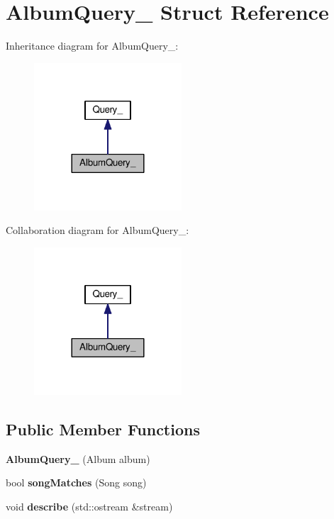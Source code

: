 \hypertarget{struct_album_query__}{}\section{Album\+Query\+\_\+ Struct Reference}
\label{struct_album_query__}


Inheritance diagram for Album\+Query\+\_\+\+:
\nopagebreak
\begin{figure}[H]
\begin{center}
\leavevmode
\includegraphics[width=156pt]{struct_album_query____inherit__graph}
\end{center}
\end{figure}


Collaboration diagram for Album\+Query\+\_\+\+:
\nopagebreak
\begin{figure}[H]
\begin{center}
\leavevmode
\includegraphics[width=156pt]{struct_album_query____coll__graph}
\end{center}
\end{figure}
\subsection*{Public Member Functions}
\begin{DoxyCompactItemize}
\item 
{\bfseries Album\+Query\+\_\+} (Album album)\hypertarget{struct_album_query___abd744cb06957c0daacc89fb41dd13874}{}\label{struct_album_query___abd744cb06957c0daacc89fb41dd13874}

\item 
bool {\bfseries song\+Matches} (Song song)\hypertarget{struct_album_query___a006936a1e4964df9b1c71227261282d3}{}\label{struct_album_query___a006936a1e4964df9b1c71227261282d3}

\item 
void {\bfseries describe} (std\+::ostream \&stream)\hypertarget{struct_album_query___af3c11ff7248ae1a6c135ace088cb4a24}{}\label{struct_album_query___af3c11ff7248ae1a6c135ace088cb4a24}

\end{DoxyCompactItemize}


